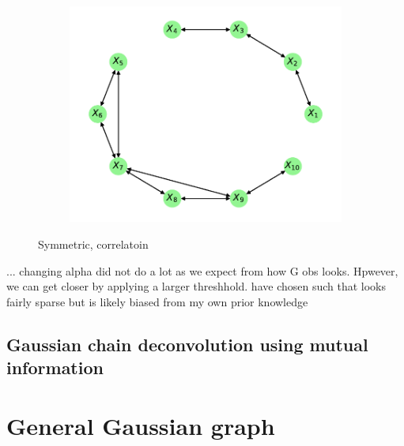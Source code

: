 \documentclass[../Thesis.tex]{subfiles}
\begin{document}
\begin{figure}[h]
\begin{subfigure}[t]{0.49\textwidth}
        \caption{}
    \end{subfigure}
    \\[\baselineskip]
    \begin{subfigure}[t]{0.49\textwidth}
        \centering
        \includegraphics[width=\linewidth]{figures/Gaussian Chain Theoretical/Chain graph from symmetric G obs.pdf}
        \caption{}
    \end{subfigure}
    \caption{Symmetric, correlatoin}
\end{figure}


... changing alpha did not do a lot as we expect from how G obs looks. Hpwever, we can get closer by applying a larger threshhold. have chosen such that looks fairly sparse but is likely biased from my own prior knowledge


\subsection{Gaussian chain deconvolution using mutual information}


\section{General Gaussian graph}\label{sec:General Gaussian graph}
\end{document}
